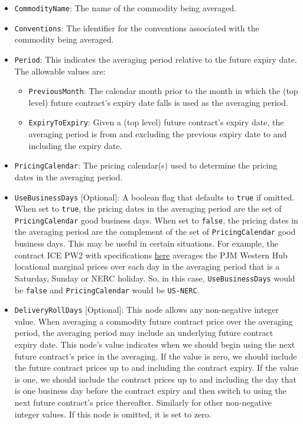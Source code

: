 \begin{itemize}
\item \lstinline!CommodityName!: The name of the commodity being averaged.
\item \lstinline!Conventions!: The identifier for the conventions associated with the commodity being averaged.
\item \lstinline!Period!: This indicates the averaging period relative to the future expiry date. The allowable values are:
    \begin{itemize}
    \item \lstinline!PreviousMonth!: The calendar month prior to the month in which the (top level) future contract's expiry date falls is used as the averaging period.
    \item \lstinline!ExpiryToExpiry!: Given a (top level) future contract's expiry date, the averaging period is from and excluding the previous expiry date to and including the expiry date.
    \end{itemize}
\item \lstinline!PricingCalendar!: The pricing calendar(s) used to determine the pricing dates in the averaging period.
\item \lstinline!UseBusinessDays! [Optional]: A boolean flag that defaults to \lstinline!true! if omitted. When set to \lstinline!true!, the pricing dates in the averaging period are the set of \lstinline!PricingCalendar! good business days. When set to \lstinline!false!, the pricing dates in the averaging period are the complement of the set of \lstinline!PricingCalendar! good business days. This may be useful in certain situations. For example, the contract ICE PW2 with specifications \href{https://www.theice.com/products/71090520/PJM-Western-Hub-Real-Time-Peak-2x16-Fixed-Price-Future}{here} averages the PJM Western Hub locational marginal prices over each day in the averaging period that is a Saturday, Sunday or NERC holiday. So, in this case, \lstinline!UseBusinessDays! would be \lstinline!false! and \lstinline!PricingCalendar! would be \lstinline!US-NERC!.
\item \lstinline!DeliveryRollDays! [Optional]: This node allows any non-negative integer value. When averaging a commodity future contract price over the averaging period, the averaging period may include an underlying future contract expiry date. This node's value indicates when we should begin using the next future contract's price in the averaging. If the value is zero, we should include the future contract prices up to and including the contract expiry. If the value is one, we should include the contract prices up to and including the day that is one business day before the contract expiry and then switch to using the next future contract's price thereafter. Similarly for other non-negative integer values. If this node is omitted, it is set to zero.

\end{itemize}
